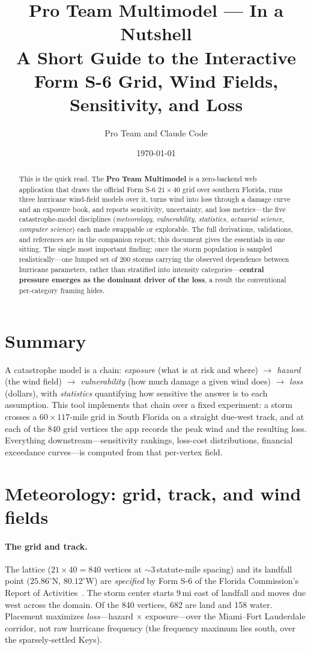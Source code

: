 \documentclass[11pt]{article}
\title{\textbf{Pro Team Multimodel --- In a Nutshell}\\[2pt]
\large A Short Guide to the Interactive Form S-6 Grid, Wind Fields,
Sensitivity, and Loss}
\author{Pro Team and Claude Code}
\date{\today}
\begin{document}
\maketitle

\begin{abstract}
\noindent This is the quick read. The \textbf{Pro Team Multimodel} is a zero-backend
web application that draws the official Form S-6 $21\times40$ grid over southern
Florida, runs three hurricane wind-field models over it, turns wind into loss through
a damage curve and an exposure book, and reports sensitivity, uncertainty, and loss
metrics---the five catastrophe-model disciplines (\emph{meteorology}, \emph{vulnerability},
\emph{statistics}, \emph{actuarial science}, \emph{computer science}) each made
swappable or explorable. The full derivations, validations, and references are in the
companion report; this document gives the essentials in one sitting. The single most
important finding: once the storm population is sampled realistically---one lumped set
of 200 storms carrying the observed dependence between hurricane parameters, rather than
stratified into intensity categories---\textbf{central pressure emerges as the dominant
driver of the loss}, a result the conventional per-category framing hides.
\end{abstract}

\section{Summary}
A catastrophe model is a chain: \emph{exposure} (what is at risk and where)
$\to$ \emph{hazard} (the wind field) $\to$ \emph{vulnerability} (how much damage a
given wind does) $\to$ \emph{loss} (dollars), with \emph{statistics} quantifying how
sensitive the answer is to each assumption. This tool implements that chain over a
fixed experiment: a storm crosses a $60\times117$-mile grid in South Florida on a
straight due-west track, and at each of the 840 grid vertices the app records the peak
wind and the resulting loss. Everything downstream---sensitivity rankings, loss-cost
distributions, financial exceedance curves---is computed from that per-vertex field.

\section{Meteorology: grid, track, and wind fields}

\paragraph{The grid and track.} The lattice ($21\times40=840$ vertices at
$\sim$3\,statute-mile spacing) and its landfall point ($25.86^\circ$N, $80.12^\circ$W)
are \emph{specified} by Form S-6 of the Florida Commission's Report of
Activities~\cite{fchlpm}. The storm center starts 9\,mi east of landfall and
moves due west across the domain. Of the 840 vertices, 682 are land and 158 water.
Placement maximizes \emph{loss}---hazard $\times$ exposure---over the Miami--Fort
Lauderdale corridor, not raw hurricane frequency (the frequency maximum lies south,
over the sparsely-settled Keys).
\end{document}
